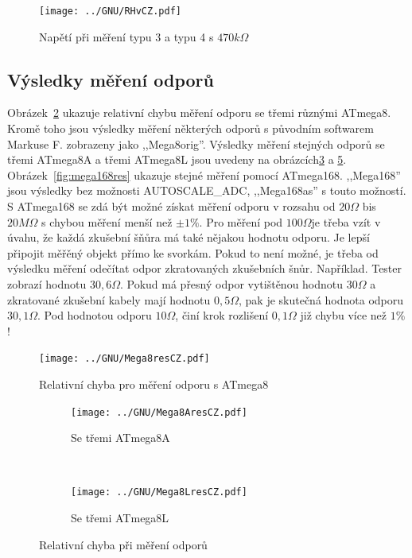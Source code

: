 \begin{figure}[H]
\centering
 \texttt{[image: ../GNU/RHvCZ.pdf]}
\caption{Napětí při měření typu 3 a typu 4 s \(470k\Omega\) }
\label{fig:RHv}
\end{figure}

\subsection{Výsledky měření odporů}
Obrázek~\ref{fig:mega8res}  ukazuje relativní chybu měření odporu se třemi různými ATmega8.
Kromě toho jsou výsledky měření některých odporů s původním softwarem Markuse F. zobrazeny jako ,,Mega8orig''.
Výsledky měření stejných odporů se třemi ATmega8A a třemi ATmega8L jsou uvedeny
na obrázcích\ref{fig:mega8Ares} a \ref{fig:mega8Lres}.
Obrázek~\ref{fig:mega168res} ukazuje stejné měření pomocí ATmega168.
,,Mega168'' jsou výsledky bez možnosti AUTOSCALE\_ADC, ,,Mega168as'' s touto možností.
S ATmega168 se zdá být možné získat měření odporu v rozsahu od \(20\Omega\) bis
\(20M\Omega\) s chybou měření menší než  \(\pm1\%\).
Pro měření pod \(100\Omega\)je třeba vzít v úvahu, že každá zkušební šňůra má také nějakou hodnotu odporu.
Je lepší připojit měřěný objekt přímo ke svorkám.
Pokud to není možné, je třeba od výsledku měření odečítat odpor zkratovaných zkušebních šnůr.
Například. Tester zobrazí hodnotu \(30,6\Omega\). Pokud má přesný odpor vytištěnou hodnotu \(30\Omega\)
a zkratované zkušební kabely mají hodnotu  \(0,5\Omega\), pak je skutečná hodnota odporu \(30,1\Omega\).
Pod hodnotou odporu \(10\Omega\), činí krok rozlišení \(0,1\Omega\) již chybu více než \(1\%\)!

\begin{figure}[H]
\centering
 \texttt{[image: ../GNU/Mega8resCZ.pdf]}
\caption{Relativní chyba pro měření odporu s ATmega8}
\label{fig:mega8res}
\end{figure}

\begin{figure}[H]
  \begin{subfigure}[b]{.5\textwidth}
    \centering
    \texttt{[image: ../GNU/Mega8AresCZ.pdf]}
    \caption{Se třemi ATmega8A}
    \label{fig:mega8Ares}
  \end{subfigure}
  ~
  \begin{subfigure}[b]{.5\textwidth}
    \centering
    \texttt{[image: ../GNU/Mega8LresCZ.pdf]}
    \caption{Se třemi ATmega8L}
    \label{fig:mega8Lres}
  \end{subfigure}
\caption{Relativní chyba při měření odporů}
\end{figure}

